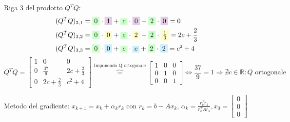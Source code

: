 \documentclass[12pt,a4paper]{article}
\begin{document}
\vspace{1em}
\noindent
Riga 3 del prodotto $Q^T Q$:
\[
\begin{aligned}
(Q^T Q)_{3,1} &= \colorbox{green!20}{$0$} \cdot \colorbox{violet!20}{$1$} + \colorbox{green!20}{$c$} \cdot \colorbox{violet!20}{$0$} + \colorbox{green!20}{$2$} \cdot \colorbox{violet!20}{$0$} = 0 \\
(Q^T Q)_{3,2} &= \colorbox{green!20}{$0$} \cdot \colorbox{yellow!20}{$0$} + \colorbox{green!20}{$c$} \cdot \colorbox{yellow!20}{$2$} + \colorbox{green!20}{$2$} \cdot \colorbox{yellow!20}{$\frac{1}{3}$} = 2c + \frac{2}{3} \\
(Q^T Q)_{3,3} &= \colorbox{green!20}{$0$} \cdot \colorbox{cyan!20}{$0$} + \colorbox{green!20}{$c$} \cdot \colorbox{cyan!20}{$c$} + \colorbox{green!20}{$2$} \cdot \colorbox{cyan!20}{$2$} = c^2 + 4
\end{aligned}
\]
\vspace{1em}
\[
Q^T Q =
\begin{bmatrix}
1 & 0 & 0 \\
0 & \frac{37}{9} & 2c + \frac{2}{3} \\
0 & 2c + \frac{2}{3} & c^2 + 4
\end{bmatrix}
\overbrace{=}^{\text{Imponendo Q ortogonale}}
\begin{bmatrix}
1 & 0 & 0 \\
0 & 1 & 0 \\
0 & 0 & 1
\end{bmatrix}
\iff
\frac{37}{9} = 1 \Rightarrow
\nexists c \in \mathbb{R} : Q \text{ ortogonale}
\]

\newpage
\noindent
{}

\vspace{1em}

Metodo del gradiente: $x_{k+1} = x_k + \alpha_k r_k$ con $r_k = b - Ax_k$, $\alpha_k = \frac{r_k^T r_k}{r_k^T A r_k},x_0 = \begin{bmatrix} 0 \\ 0 \\ 0 \end{bmatrix}$
\end{document}
